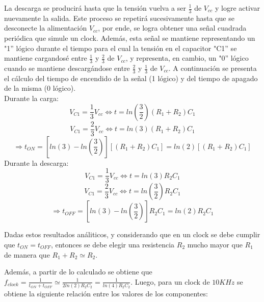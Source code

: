 La descarga se producirá hasta que la tensión vuelva a ser $\frac{1}{3}$
de $V_{cc}$ y logre activar nuevamente la salida. Este proceso se
repetirá sucesivamente hasta que se desconecte la alimentación $V_{cc}$,
por ende, se logra obtener una señal cuadrada periódica que simule
un clock. Además, esta señal se mantiene representando un "1''
lógico durante el tiempo para el cual la tensión en el capacitor "C1''
se mantiene cargandosé entre $\frac{1}{3}$ y $\frac{2}{3}$ de $V_{cc}$,
y representa, en cambio, un "0'' lógico cuando se mantiene descargándose
entre $\frac{2}{3}$ y $\frac{1}{3}$ de $V_{cc}$. A continuación
se presenta el cálculo del tiempo de encendido de la señal (1
lógico) y del tiempo de apagado de la misma (0 lógico).\\
\vspace{5mm}
Durante la carga:
\begin{equation}
V_{C1}=\frac{1}{3}V_{cc}\Longleftrightarrow t=ln(\frac{3}{2})(R_{1}+R_{2})C_{1}    
\end{equation}
\begin{equation}
V_{C1}=\frac{2}{3}V_{cc}\Longleftrightarrow t=ln(3)(R_{1}+R_{2})C_{1}
\end{equation}
\begin{equation}
\Rightarrow t_{ON}=[ln(3)-ln(\frac{3}{2})][(R_{1}+R_{2})C_{1}]=ln(2)[(R_{1}+R_{2})C_{1}]
\end{equation}
\vspace{5mm}
Durante la descarga:
\begin{equation}
V_{C1}=\frac{1}{3}V_{cc}\Longleftrightarrow t=ln(3)R_{2}C_{1}
\end{equation}
\begin{equation}
V_{C1}=\frac{2}{3}V_{cc}\Longleftrightarrow t=ln(\frac{3}{2})R_{2}C_{1}
\end{equation}
\begin{equation}
\Rightarrow t_{OFF}=[ln(3)-ln(\frac{3}{2})]R_{2}C_{1}=ln(2)R_{2}C_{1}
\end{equation}

\vspace{5mm}
Dadas estos resultados análiticos, y considerando que en un clock
se debe cumplir que $t_{ON}=t_{OFF}$, entonces se debe elegir una
resistencia $R_{2}$ mucho mayor que $R_{1}$ de manera que
$R_{1}+R_{2}\simeq R_{2}$.

Además, a partir de lo calculado se obtiene que $f_{clock}=\frac{1}{t_{ON}+t_{OFF}}\simeq\frac{1}{2ln(2)R_{2}C_{2}}=\frac{1}{ln(4)R_{2}C_{2}}$.
Luego, para un clock de $10KHz$ se obtiene la siguiente relación
entre los valores de los componentes:

